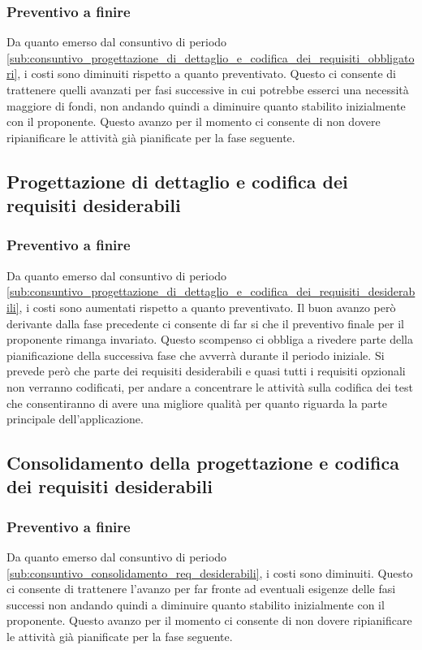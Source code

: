 		\subsubsection{Preventivo a finire} %
		Da quanto emerso dal consuntivo di periodo \ref{sub:consuntivo_progettazione_di_dettaglio_e_codifica_dei_requisiti_obbligatori}, i costi sono diminuiti rispetto a quanto preventivato. Questo ci consente di trattenere quelli avanzati per fasi successive in cui potrebbe esserci una necessità maggiore di fondi, non andando quindi a diminuire quanto stabilito inizialmente con il proponente. \newline
		Questo avanzo per il momento ci consente di non dovere ripianificare le attività già pianificate per la fase seguente.



		\subsection{Progettazione di dettaglio e codifica dei requisiti desiderabili} %

			\subsubsection{Preventivo a finire} %
			Da quanto emerso dal consuntivo di periodo \ref{sub:consuntivo_progettazione_di_dettaglio_e_codifica_dei_requisiti_desiderabili}, i costi sono aumentati rispetto a quanto preventivato. Il buon avanzo però derivante dalla fase precedente ci consente di far si che il preventivo finale per il proponente rimanga invariato.
			Questo scompenso ci obbliga a rivedere parte della pianificazione della successiva fase che avverrà durante il periodo iniziale. \newline
			Si prevede però che parte dei requisiti desiderabili e quasi tutti i requisiti opzionali non verranno codificati, per andare a concentrare le attività sulla codifica dei test che consentiranno di avere una migliore qualità per quanto riguarda la parte principale dell'applicazione.


		\subsection{Consolidamento della progettazione e codifica dei requisiti desiderabili} %

			\subsubsection{Preventivo a finire} %
						Da quanto emerso dal consuntivo di periodo \ref{sub:consuntivo_consolidamento_req_desiderabili}, i costi sono diminuiti. Questo ci consente di trattenere l'avanzo per far fronte ad eventuali esigenze delle fasi successi non andando quindi a diminuire quanto stabilito inizialmente con il proponente. \newline
				Questo avanzo per il momento ci consente di non dovere ripianificare le attività già pianificate per la fase seguente.

